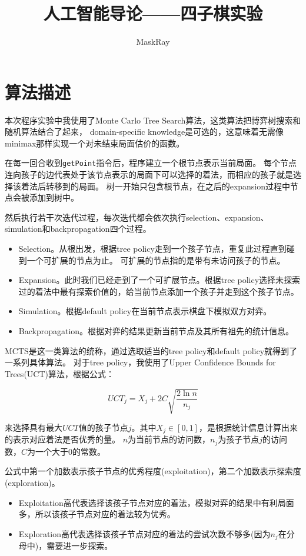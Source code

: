 \title{人工智能导论——四子棋实验}
\author{MaskRay}
\date{\the{}\the{}\the{}}
\maketitle

\section{算法描述}

本次程序实验中我使用了Monte Carlo Tree Search算法，这类算法把博弈树搜索和随机算法结合了起来，
domain-specific knowledge是可选的，这意味着无需像minimax那样实现一个对未结束局面估价的函数。

在每一回合收到\texttt{getPoint}指令后，程序建立一个根节点表示当前局面。
每个节点连向孩子的边代表处于该节点表示的局面下可以选择的着法，而相应的孩子就是选择该着法后转移到的局面。
树一开始只包含根节点，在之后的expansion过程中节点会被添加到树中。

然后执行若干次迭代过程，每次迭代都会依次执行selection、expansion、simulation和backpropagation四个过程。

\begin{itemize}
  \item Selection。从根出发，根据tree policy走到一个孩子节点，重复此过程直到碰到一个可扩展的节点为止。
    可扩展的节点指的是带有未访问孩子的节点。
  \item Expansion。此时我们已经走到了一个可扩展节点。根据tree policy选择未探索过的着法中最有探索价值的，给当前节点添加一个孩子并走到这个孩子节点。
  \item Simulation。根据default policy在当前节点表示棋盘下模拟双方对弈。
  \item Backpropagation。根据对弈的结果更新当前节点及其所有祖先的统计信息。
\end{itemize}

MCTS是这一类算法的统称，通过选取适当的tree policy和default policy就得到了一系列具体算法。
对于tree policy，我使用了Upper Confidence Bounds for Trees(UCT)算法，根据公式：

$$
UCT_j = X_j + 2C\sqrt{\frac{2\ln{n}}{n_j}}
$$

来选择具有最大$UCT$值的孩子节点$j$。其中$X_j\in [0, 1]$，是根据统计信息计算出来的表示对应着法是否优秀的量。
$n$为当前节点的访问数，$n_j$为孩子节点$j$的访问数，$C$为一个大于0的常数。

公式中第一个加数表示孩子节点的优秀程度(exploitation)，第二个加数表示探索度(exploration)。

\begin{itemize}
  \item Exploitation高代表选择该孩子节点对应的着法，模拟对弈的结果中有利局面多，所以该孩子节点对应的着法较为优秀。
  \item Exploration高代表选择该孩子节点对应的着法的尝试次数不够多(因为$n_j$在分母中)，需要进一步探索。
\end{itemize}

